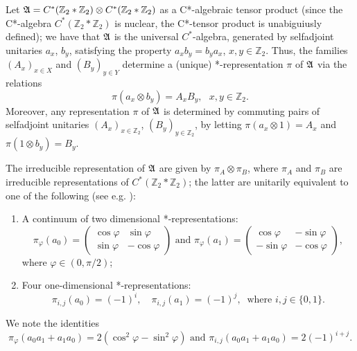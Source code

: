 \documentclass[11pt]{amsart}
\theoremstyle{definition}
\newcommand{\bb}[1]{\mathbb{#1}}
\begin{document}
Let $\frak A=C^*(\mathbb Z_2\ast\mathbb Z_2)\otimes C^*(\mathbb Z_2\ast\mathbb Z_2)$ as a C*-algebraic tensor product 
(since the C*-algebra $C^*(\mathbb Z_2\ast\mathbb Z_2)$ is nuclear, the C*-tensor product is unabiguiusly defined); we have that 
$\frak A$ is the universal $C^*$-algebra, generated by selfadjoint unitaries $a_x$, $b_y$, satisfying the 
property $a_xb_y = b_y a_x$, $x,y\in \bb{Z}_2$. 
Thus, the families $(A_x)_{x\in X}$ and $(B_y)_{y\in Y}$ determine a (unique) *-representation $\pi$ of $\frak A$ 
via the relations 
$$\pi(a_x\otimes b_y) = A_xB_y, \ \ \ x,y\in\mathbb Z_2.$$
Moreover, any representation $\pi$ of $\frak A$ is determined by commuting pairs of selfadjoint unitaries $(A_x)_{x\in \mathbb Z_2}$, $(B_y)_{y\in \mathbb Z_2}$,  by letting $\pi(a_x\otimes 1)=A_x$ and  $\pi(1\otimes b_y)=B_y$. 

The irreducible representation of $\frak A$ are given by $\pi_A\otimes\pi_B$, where $\pi_A$ and $\pi_B$ are irreducible representations of $C^*(\mathbb Z_2\ast\mathbb Z_2)$; the latter are unitarily equivalent to one of the following (see e.g. \cite{os}): 

\begin{enumerate}
\item A continuum of two dimensional *-representations:
$$\pi_{\varphi}(a_0)=\left(\begin{array}{cc} \cos\varphi & \sin\varphi \\
\sin\varphi &-\cos\varphi \end{array}\right) \mbox{ and } 
\pi_{\varphi}(a_1)=\left(\begin{array}{cc} \cos\varphi&-\sin\varphi\\-\sin\varphi&-\cos\varphi\end{array}\right),$$
where $\varphi\in(0,\pi/2)$; 

\item Four one-dimensional *-representations: 
$$\pi_{i,j}(a_0)=(-1)^i, \quad \pi_{i,j}(a_1)=(-1)^j, 
\ \mbox{ where }  i,j\in\{0,1\}.$$
\end{enumerate}
We note the identities 
\begin{equation}\label{eq_a0a1}
\pi_{\varphi}(a_0a_1+a_1a_0) = 2(\cos^2\varphi - \sin^2\varphi) \text{ and }\pi_{i,j}(a_0a_1+a_1a_0)=2(-1)^{i+j}.
\end{equation}
\end{document}
